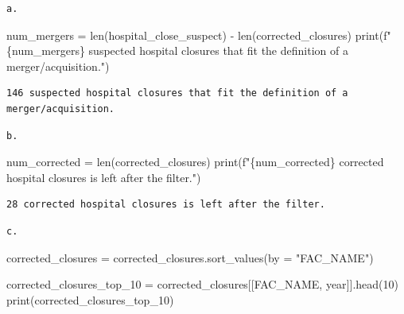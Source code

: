 \documentclass[
  letterpaper,
  DIV=11,
  numbers=noendperiod]{scrartcl}
\newenvironment{Shaded}{\begin{snugshade}}{\end{snugshade}}
\newcommand{\BuiltInTok}[1]{\textcolor[rgb]{0.00,0.23,0.31}{#1}}
\newcommand{\DecValTok}[1]{\textcolor[rgb]{0.68,0.00,0.00}{#1}}
\newcommand{\NormalTok}[1]{\textcolor[rgb]{0.00,0.23,0.31}{#1}}
\newcommand{\OperatorTok}[1]{\textcolor[rgb]{0.37,0.37,0.37}{#1}}
\newcommand{\SpecialCharTok}[1]{\textcolor[rgb]{0.37,0.37,0.37}{#1}}
\newcommand{\SpecialStringTok}[1]{\textcolor[rgb]{0.13,0.47,0.30}{#1}}
\newcommand{\StringTok}[1]{\textcolor[rgb]{0.13,0.47,0.30}{#1}}
\begin{document}
\begin{verbatim}
a.
\end{verbatim}

\begin{Shaded}
\begin{Highlighting}[]
\NormalTok{num\_mergers }\OperatorTok{=} \BuiltInTok{len}\NormalTok{(hospital\_close\_suspect) }\OperatorTok{{-}} \BuiltInTok{len}\NormalTok{(corrected\_closures)}
\BuiltInTok{print}\NormalTok{(}\SpecialStringTok{f"}\SpecialCharTok{\{}\NormalTok{num\_mergers}\SpecialCharTok{\}}\SpecialStringTok{ suspected hospital closures that fit the definition of a merger/acquisition."}\NormalTok{)}
\end{Highlighting}
\end{Shaded}

\begin{verbatim}
146 suspected hospital closures that fit the definition of a merger/acquisition.
\end{verbatim}

\begin{verbatim}
b.
\end{verbatim}

\begin{Shaded}
\begin{Highlighting}[]
\NormalTok{num\_corrected }\OperatorTok{=} \BuiltInTok{len}\NormalTok{(corrected\_closures)}
\BuiltInTok{print}\NormalTok{(}\SpecialStringTok{f"}\SpecialCharTok{\{}\NormalTok{num\_corrected}\SpecialCharTok{\}}\SpecialStringTok{ corrected hospital closures is left after the filter."}\NormalTok{)}
\end{Highlighting}
\end{Shaded}

\begin{verbatim}
28 corrected hospital closures is left after the filter.
\end{verbatim}

\begin{verbatim}
c.
\end{verbatim}

\begin{Shaded}
\begin{Highlighting}[]
\NormalTok{corrected\_closures }\OperatorTok{=}\NormalTok{ corrected\_closures.sort\_values(by }\OperatorTok{=} \StringTok{"FAC\_NAME"}\NormalTok{)}

\NormalTok{corrected\_closures\_top\_10 }\OperatorTok{=}\NormalTok{ corrected\_closures[[}\StringTok{\textquotesingle{}FAC\_NAME\textquotesingle{}}\NormalTok{, }\StringTok{\textquotesingle{}year\textquotesingle{}}\NormalTok{]].head(}\DecValTok{10}\NormalTok{)}
\BuiltInTok{print}\NormalTok{(corrected\_closures\_top\_10)}
\end{Highlighting}
\end{Shaded}
\end{document}
